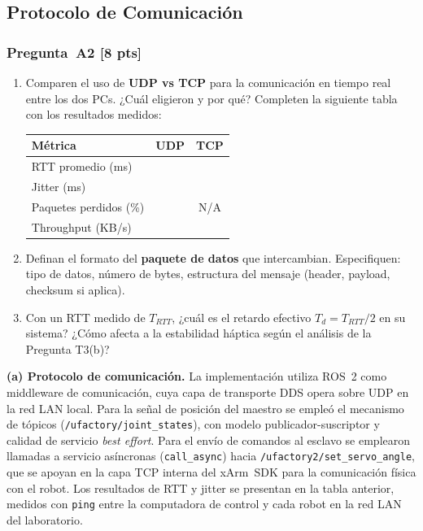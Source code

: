 \documentclass[journal,10pt,twoside]{IEEEtran}
\newcommand{\answerline}[1][3cm]{\underline{\hspace{#1}}}
\newcommand{\pts}[1]{\textbf{\color{tec_red}[#1 pts]}}
\begin{document}
\subsection{Protocolo de Comunicación}

\subsubsection*{Pregunta~A2 \pts{8}}
\begin{enumerate}[label=(\alph*)]
  \item Comparen el uso de \textbf{UDP vs TCP} para la comunicación
        en tiempo real entre los dos PCs. ¿Cuál eligieron y por qué?
        Completen la siguiente tabla con los resultados medidos:

        \begin{center}
        \small
        \begin{tabular}{lcc}
          \toprule
          \textbf{Métrica} & \textbf{UDP} & \textbf{TCP} \\
          \midrule
          RTT promedio (ms)     & \answerline & \answerline \\
          Jitter (ms)           & \answerline & \answerline \\
          Paquetes perdidos (\%) & \answerline & N/A \\
          Throughput (KB/s)     & \answerline & \answerline \\
          \bottomrule
        \end{tabular}
        \end{center}

  \item Definan el formato del \textbf{paquete de datos} que intercambian.
        Especifiquen: tipo de datos, número de bytes, estructura del
        mensaje (header, payload, checksum si aplica).
  \item Con un RTT medido de $T_{RTT}$, ¿cuál es el retardo efectivo
        $T_d = T_{RTT}/2$ en su sistema? ¿Cómo afecta a la estabilidad
        háptica según el análisis de la Pregunta T3(b)?
\end{enumerate}

\textbf{(a) Protocolo de comunicación.}
La implementación utiliza ROS~2 como middleware de comunicación,
cuya capa de transporte DDS opera sobre UDP en la red LAN local.
Para la señal de posición del maestro se empleó el mecanismo de
tópicos (\texttt{/ufactory/joint\_states}), con modelo
publicador-suscriptor y calidad de servicio \textit{best effort}.
Para el envío de comandos al esclavo se emplearon llamadas a
servicio asíncronas (\texttt{call\_async}) hacia
\texttt{/ufactory2/set\_servo\_angle}, que se apoyan en la capa
TCP interna del xArm~SDK para la comunicación física con el robot.
Los resultados de RTT y jitter se presentan en la tabla anterior,
medidos con \texttt{ping} entre la computadora de control y cada
robot en la red LAN del laboratorio.
\end{document}
